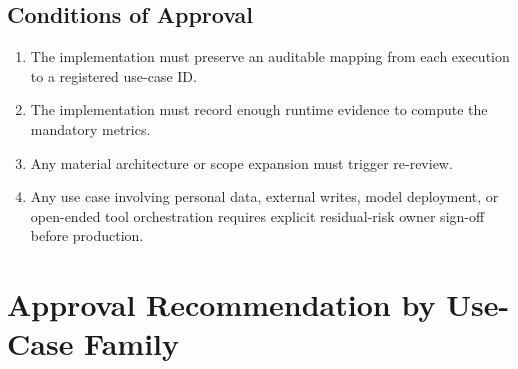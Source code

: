 \documentclass[11pt,a4paper]{article}
\begin{document}
\subsection{Conditions of Approval}

\begin{enumerate}[nosep]
    \item The implementation must preserve an auditable mapping from each execution to a registered use-case ID.
    \item The implementation must record enough runtime evidence to compute the mandatory metrics.
    \item Any material architecture or scope expansion must trigger re-review.
    \item Any use case involving personal data, external writes, model deployment, or open-ended tool orchestration requires explicit residual-risk owner sign-off before production.
\end{enumerate}

\section{Approval Recommendation by Use-Case Family}
\end{document}
